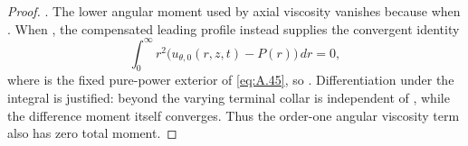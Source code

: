 \begin{proof}
. The lower angular moment used by axial viscosity vanishes because
 when . When , the compensated
leading profile instead supplies the convergent identity
\begin{equation}\label{eq:5.19}
\int_0^\infty r^2\bigl(u_{\theta,0}(r,z,t)-P(r)\bigr)\,dr=0,
\tag{5.19}
\end{equation}
where  is the fixed pure-power exterior of \eqref{eq:A.45}, so
. Differentiation under the integral is justified: beyond the varying terminal collar
 is independent of , while the difference moment itself converges.
Thus the order-one angular viscosity term also has zero total moment.


\end{proof}
